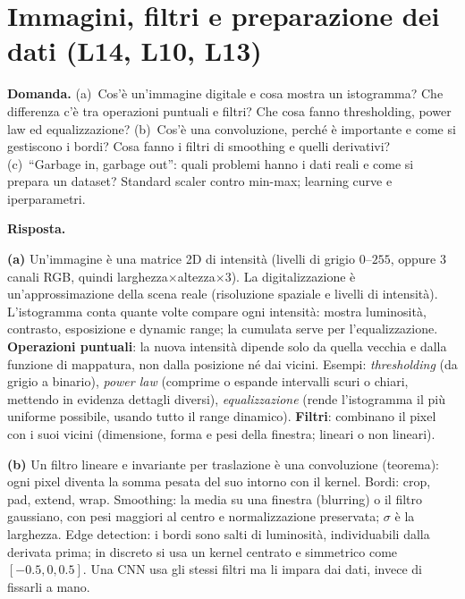 \documentclass[11pt,a4paper]{article}
\newcommand{\Dom}[1]{\par\medskip\noindent\textbf{Domanda.} #1\par\nopagebreak}
\newcommand{\Ris}[1]{\noindent\textbf{Risposta.}\par\nopagebreak #1}
\begin{document}
\section{Immagini, filtri e preparazione dei dati (L14, L10, L13)}

\Dom{(a)~Cos'\`e un'immagine digitale e cosa mostra un istogramma? Che differenza c'\`e tra operazioni puntuali e filtri? Che cosa fanno thresholding, power law ed equalizzazione?
(b)~Cos'\`e una convoluzione, perch\'e \`e importante e come si gestiscono i bordi? Cosa fanno i filtri di smoothing e quelli derivativi?
(c)~``Garbage in, garbage out'': quali problemi hanno i dati reali e come si prepara un dataset? Standard scaler contro min-max; learning curve e iperparametri.}

\Ris{
\textbf{(a)} Un'immagine \`e una matrice 2D di intensit\`a (livelli di grigio $0$--$255$, oppure $3$ canali RGB, quindi larghezza$\times$altezza$\times3$). La digitalizzazione \`e un'approssimazione della scena reale (risoluzione spaziale e livelli di intensit\`a).
L'istogramma conta quante volte compare ogni intensit\`a: mostra luminosit\`a, contrasto, esposizione e dynamic range; la cumulata serve per l'equalizzazione.
\textbf{Operazioni puntuali}: la nuova intensit\`a dipende solo da quella vecchia e dalla funzione di mappatura, non dalla posizione n\'e dai vicini. Esempi: \emph{thresholding} (da grigio a binario), \emph{power law} (comprime o espande intervalli scuri o chiari, mettendo in evidenza dettagli diversi), \emph{equalizzazione} (rende l'istogramma il pi\`u uniforme possibile, usando tutto il range dinamico).
\textbf{Filtri}: combinano il pixel con i suoi vicini (dimensione, forma e pesi della finestra; lineari o non lineari).

\textbf{(b)} Un filtro lineare e invariante per traslazione \`e una convoluzione (teorema): ogni pixel diventa la somma pesata del suo intorno con il kernel.
Bordi: crop, pad, extend, wrap.
Smoothing: la media su una finestra (blurring) o il filtro gaussiano, con pesi maggiori al centro e normalizzazione preservata; $\sigma$ \`e la larghezza.
Edge detection: i bordi sono salti di luminosit\`a, individuabili dalla derivata prima; in discreto si usa un kernel centrato e simmetrico come $[-0.5,0,0.5]$.
Una CNN usa gli stessi filtri ma li impara dai dati, invece di fissarli a mano.

}
\end{document}
